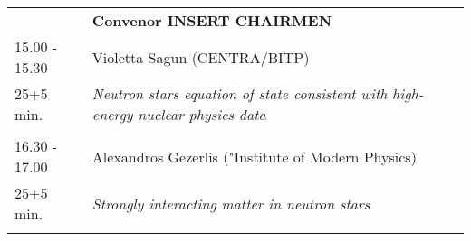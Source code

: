 \begin{longtable}{p{3cm}p{13cm}}
&\hfill {\bf Convenor INSERT CHAIRMEN }\\ 
15.00 - 15.30 & Violetta Sagun (CENTRA/BITP)\\ 
25+5 min. & {\it Neutron stars equation of state consistent with high-energy nuclear physics data}\\ 
 & \\ 
16.30 - 17.00 & Alexandros Gezerlis ("Institute of Modern Physics)\\ 
25+5 min. & {\it Strongly interacting matter in neutron stars}\\ 
 & \\ 
\end{longtable}


